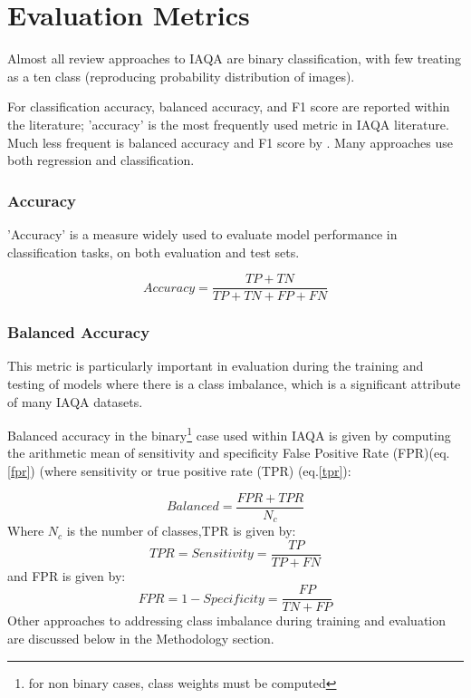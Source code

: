 

\section{Evaluation Metrics}
\label{sec:evaluation_metrics}

Almost all review approaches to IAQA are binary classification, with few treating as a ten class (reproducing probability distribution of images). 

For classification accuracy, balanced accuracy, and F1 score are reported within the literature; 'accuracy' is the most frequently used metric in IAQA literature\cite{Koa2016b,Schwarz2018a,Lu2014a,Ma2017,Chen2020b,Zhang2021d}. Much less frequent is balanced accuracy\cite{Deng2017} and F1 score by \cite{Ma2017, Mai2016a}. Many approaches use both regression and classification.  

\subsubsection{Accuracy}

'Accuracy' is a measure widely used to evaluate model performance in classification tasks, on both evaluation and test sets. 

\begin{equation}
    Accuracy = \frac{TP+TN}{TP+TN+FP+FN}
\end{equation}

\subsubsection{Balanced Accuracy}

This metric is particularly important in evaluation during the training and testing of models where there is a class imbalance, which is a significant attribute of many IAQA datasets. 

Balanced accuracy in the binary\footnote{for non binary cases, class weights must be computed} case used within IAQA is given by computing the arithmetic mean of sensitivity and specificity False Positive Rate (FPR)(eq.\ref{fpr}) (where sensitivity or true positive rate (TPR) (eq.\ref{tpr}):

\begin{equation}
    Balanced = \dfrac{FPR+TPR}{N_c}
\end{equation}
Where $N_c$ is the number of classes,TPR is given by:
\begin{equation}
    TPR = Sensitivity = \frac{TP}{TP+FN}
    \label{tpr}
\end{equation}
 and FPR is given by: 
\begin{equation}
    FPR = 1 - Specificity = \frac{FP}{TN+FP}
    \label{fpr}
\end{equation}
Other approaches to addressing class imbalance during training and evaluation are discussed below in the Methodology section.


